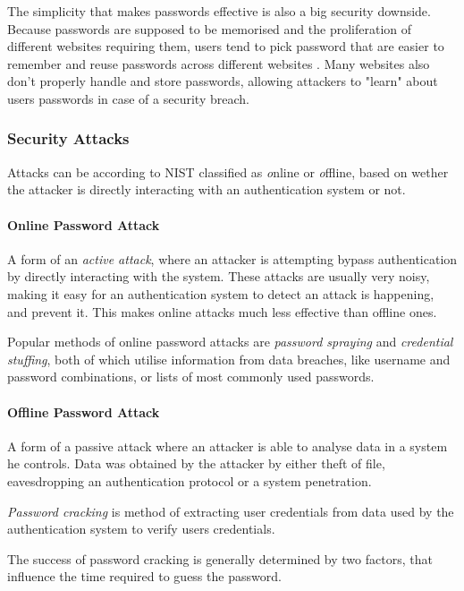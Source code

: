 The simplicity that makes passwords effective is also a big security downside.
Because passwords are supposed to be memorised and the proliferation of different websites requiring them, users tend to pick password that are easier to remember and reuse passwords across different websites \cite{conklin2004password}.
Many websites also don't properly handle and store passwords, allowing attackers to "learn" about users passwords in case of a security breach.

\subsubsection{Security Attacks}
Attacks can be according to NIST \cite{grassi2017} classified as \textit online or \textit offline, based on wether the attacker is directly interacting with an authentication system or not.

\paragraph{Online Password Attack} A form of an \textit{active attack}, where an attacker is attempting bypass authentication by directly interacting with the system.
These attacks are usually very noisy, making it easy for an authentication system to detect an attack is happening, and prevent it.
This makes online attacks much less effective than offline ones.

Popular methods of online password attacks are \textit{password spraying} and \textit{credential stuffing}, both of which utilise information from data breaches, like username  and password combinations, or lists of most commonly used passwords. %

\paragraph{Offline Password Attack} A form of a passive attack where an attacker is able to analyse data in a system he controls. Data was obtained by the attacker by either theft of file, eavesdropping an authentication protocol or a system penetration.

\textit{Password cracking} is method of extracting user credentials from data used by the authentication system to verify users credentials.

The success of password cracking is generally determined by two factors, that influence the time required to guess the password.


